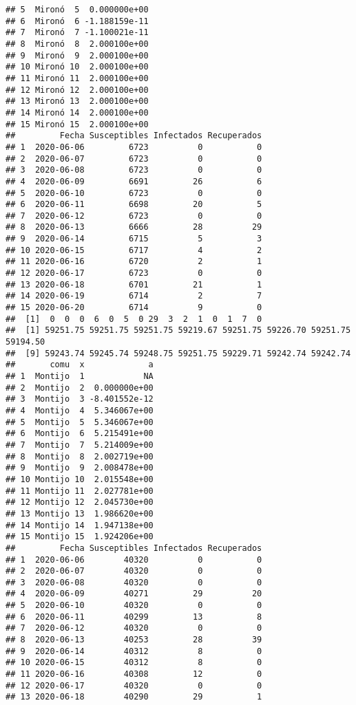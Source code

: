 \documentclass[
]{article}
\begin{document}
\begin{verbatim}
## 5  Mironó  5  0.000000e+00
## 6  Mironó  6 -1.188159e-11
## 7  Mironó  7 -1.100021e-11
## 8  Mironó  8  2.000100e+00
## 9  Mironó  9  2.000100e+00
## 10 Mironó 10  2.000100e+00
## 11 Mironó 11  2.000100e+00
## 12 Mironó 12  2.000100e+00
## 13 Mironó 13  2.000100e+00
## 14 Mironó 14  2.000100e+00
## 15 Mironó 15  2.000100e+00
##         Fecha Susceptibles Infectados Recuperados
## 1  2020-06-06         6723          0           0
## 2  2020-06-07         6723          0           0
## 3  2020-06-08         6723          0           0
## 4  2020-06-09         6691         26           6
## 5  2020-06-10         6723          0           0
## 6  2020-06-11         6698         20           5
## 7  2020-06-12         6723          0           0
## 8  2020-06-13         6666         28          29
## 9  2020-06-14         6715          5           3
## 10 2020-06-15         6717          4           2
## 11 2020-06-16         6720          2           1
## 12 2020-06-17         6723          0           0
## 13 2020-06-18         6701         21           1
## 14 2020-06-19         6714          2           7
## 15 2020-06-20         6714          9           0
##  [1]  0  0  0  6  0  5  0 29  3  2  1  0  1  7  0
##  [1] 59251.75 59251.75 59251.75 59219.67 59251.75 59226.70 59251.75 59194.50
##  [9] 59243.74 59245.74 59248.75 59251.75 59229.71 59242.74 59242.74
##       comu  x             a
## 1  Montijo  1            NA
## 2  Montijo  2  0.000000e+00
## 3  Montijo  3 -8.401552e-12
## 4  Montijo  4  5.346067e+00
## 5  Montijo  5  5.346067e+00
## 6  Montijo  6  5.215491e+00
## 7  Montijo  7  5.214009e+00
## 8  Montijo  8  2.002719e+00
## 9  Montijo  9  2.008478e+00
## 10 Montijo 10  2.015548e+00
## 11 Montijo 11  2.027781e+00
## 12 Montijo 12  2.045730e+00
## 13 Montijo 13  1.986620e+00
## 14 Montijo 14  1.947138e+00
## 15 Montijo 15  1.924206e+00
##         Fecha Susceptibles Infectados Recuperados
## 1  2020-06-06        40320          0           0
## 2  2020-06-07        40320          0           0
## 3  2020-06-08        40320          0           0
## 4  2020-06-09        40271         29          20
## 5  2020-06-10        40320          0           0
## 6  2020-06-11        40299         13           8
## 7  2020-06-12        40320          0           0
## 8  2020-06-13        40253         28          39
## 9  2020-06-14        40312          8           0
## 10 2020-06-15        40312          8           0
## 11 2020-06-16        40308         12           0
## 12 2020-06-17        40320          0           0
## 13 2020-06-18        40290         29           1

\end{verbatim}
\end{document}
